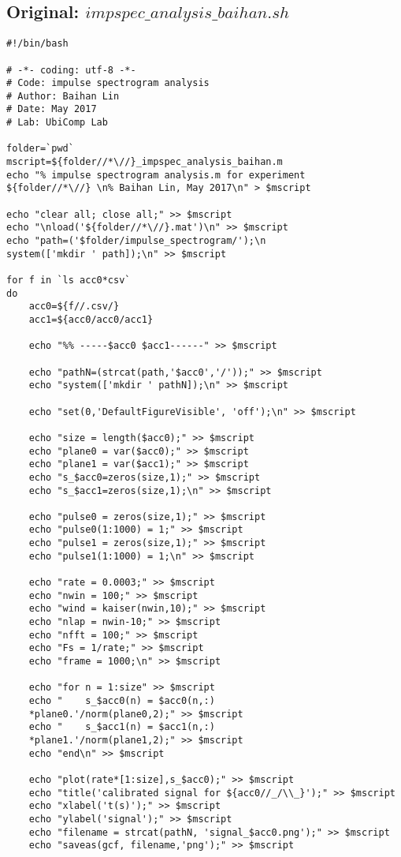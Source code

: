 \documentclass{sigchi}
\begin{document}
\subsection{Original: $impspec\_analysis\_baihan.sh$}\label{ss:imospc_ana.sh}
\begin{lstlisting}
#!/bin/bash

# -*- coding: utf-8 -*-
# Code: impulse spectrogram analysis
# Author: Baihan Lin
# Date: May 2017
# Lab: UbiComp Lab

folder=`pwd`
mscript=${folder//*\//}_impspec_analysis_baihan.m
echo "% impulse spectrogram analysis.m for experiment 
${folder//*\//} \n% Baihan Lin, May 2017\n" > $mscript

echo "clear all; close all;" >> $mscript
echo "\nload('${folder//*\//}.mat')\n" >> $mscript
echo "path=('$folder/impulse_spectrogram/');\n
system(['mkdir ' path]);\n" >> $mscript

for f in `ls acc0*csv`
do
    acc0=${f//.csv/}
    acc1=${acc0/acc0/acc1}

	echo "%% -----$acc0 $acc1------" >> $mscript

	echo "pathN=(strcat(path,'$acc0','/'));" >> $mscript
	echo "system(['mkdir ' pathN]);\n" >> $mscript

	echo "set(0,'DefaultFigureVisible', 'off');\n" >> $mscript
	
	echo "size = length($acc0);" >> $mscript
	echo "plane0 = var($acc0);" >> $mscript
	echo "plane1 = var($acc1);" >> $mscript
	echo "s_$acc0=zeros(size,1);" >> $mscript
	echo "s_$acc1=zeros(size,1);\n" >> $mscript

	echo "pulse0 = zeros(size,1);" >> $mscript
	echo "pulse0(1:1000) = 1;" >> $mscript
	echo "pulse1 = zeros(size,1);" >> $mscript
	echo "pulse1(1:1000) = 1;\n" >> $mscript

	echo "rate = 0.0003;" >> $mscript
	echo "nwin = 100;" >> $mscript
	echo "wind = kaiser(nwin,10);" >> $mscript
	echo "nlap = nwin-10;" >> $mscript
	echo "nfft = 100;" >> $mscript
	echo "Fs = 1/rate;" >> $mscript
	echo "frame = 1000;\n" >> $mscript

	echo "for n = 1:size" >> $mscript
	echo "    s_$acc0(n) = $acc0(n,:)
    *plane0.'/norm(plane0,2);" >> $mscript
	echo "    s_$acc1(n) = $acc1(n,:)
    *plane1.'/norm(plane1,2);" >> $mscript
	echo "end\n" >> $mscript

	echo "plot(rate*[1:size],s_$acc0);" >> $mscript
	echo "title('calibrated signal for ${acc0//_/\\_}');" >> $mscript
	echo "xlabel('t(s)');" >> $mscript
	echo "ylabel('signal');" >> $mscript
	echo "filename = strcat(pathN, 'signal_$acc0.png');" >> $mscript
	echo "saveas(gcf, filename,'png');" >> $mscript


\end{lstlisting}
\end{document}
